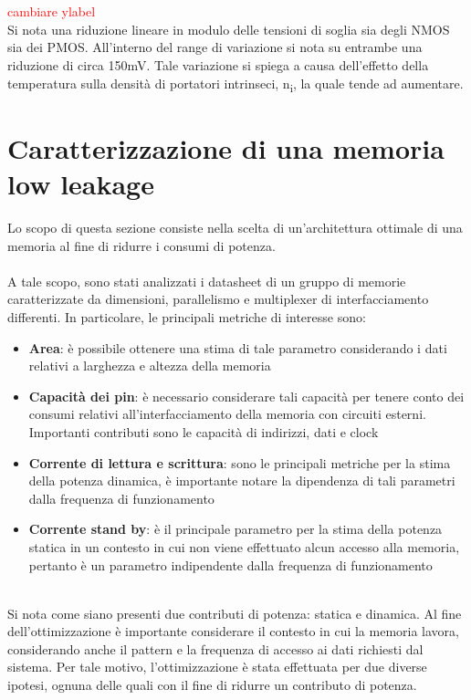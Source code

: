 \documentclass[11pt,  english, makeidx, a4paper, titlepage, oneside]{book}
\begin{document}
\\\\
\textcolor{red}{cambiare ylabel}
\\
Si nota una riduzione lineare in modulo delle tensioni di soglia sia degli NMOS sia dei PMOS. All'interno del range di variazione si nota su entrambe una riduzione di circa 150mV. Tale variazione si spiega a causa dell'effetto della temperatura sulla densità di portatori intrinseci, n\textsubscript{i}, la quale tende ad aumentare.
\newpage
\section{Caratterizzazione di una memoria low leakage}
Lo scopo di questa sezione consiste nella scelta di un'architettura ottimale di una memoria al fine di ridurre i consumi di potenza.
\\\\
A tale scopo, sono stati analizzati i datasheet di un gruppo di memorie caratterizzate da dimensioni, parallelismo e multiplexer di interfacciamento differenti. In particolare, le principali metriche di interesse sono:
\begin{itemize}
\item \textbf{Area}: è possibile ottenere una stima di tale parametro considerando i dati relativi a larghezza e altezza della memoria\\
\item \textbf{Capacità dei pin}: è necessario considerare tali capacità per tenere conto dei consumi relativi all'interfacciamento della memoria con circuiti esterni. Importanti contributi sono le capacità di indirizzi, dati e clock\\
\item \textbf{Corrente di lettura e scrittura}: sono le principali metriche per la stima della potenza dinamica, è importante notare la dipendenza di tali parametri dalla frequenza di funzionamento\\
\item \textbf{Corrente stand by}: è il principale parametro per la stima della potenza statica in un contesto in cui non viene effettuato alcun accesso alla memoria, pertanto è un parametro indipendente dalla frequenza di funzionamento\\\\
\end{itemize}
Si nota come siano presenti due contributi di potenza: statica e dinamica. Al fine dell'ottimizzazione è importante considerare il contesto in cui la memoria lavora, considerando anche il pattern e la frequenza di accesso ai dati richiesti dal sistema. Per tale motivo, l'ottimizzazione è stata effettuata per due diverse ipotesi, ognuna delle quali con il fine di ridurre un contributo di potenza.
\end{document}
